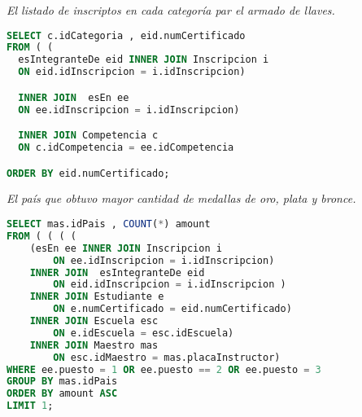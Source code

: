 

\emph{El listado de inscriptos en cada categoría par el armado de llaves.}
\begin{lstlisting}[language=SQL]
SELECT c.idCategoria , eid.numCertificado
FROM ( (
  esIntegranteDe eid INNER JOIN Inscripcion i
  ON eid.idInscripcion = i.idInscripcion)

  INNER JOIN  esEn ee
  ON ee.idInscripcion = i.idInscripcion)

  INNER JOIN Competencia c
  ON c.idCompetencia = ee.idCompetencia

ORDER BY eid.numCertificado;
\end{lstlisting}

\emph{El país que obtuvo mayor cantidad de medallas de oro, plata y bronce.}
\begin{lstlisting}[language=SQL]
SELECT mas.idPais , COUNT(*) amount
FROM ( ( ( (
    (esEn ee INNER JOIN Inscripcion i
        ON ee.idInscripcion = i.idInscripcion)
    INNER JOIN  esIntegranteDe eid
        ON eid.idInscripcion = i.idInscripcion )
    INNER JOIN Estudiante e
        ON e.numCertificado = eid.numCertificado)
    INNER JOIN Escuela esc
        ON e.idEscuela = esc.idEscuela)
    INNER JOIN Maestro mas
        ON esc.idMaestro = mas.placaInstructor)
WHERE ee.puesto = 1 OR ee.puesto == 2 OR ee.puesto = 3
GROUP BY mas.idPais
ORDER BY amount ASC
LIMIT 1;
\end{lstlisting}


